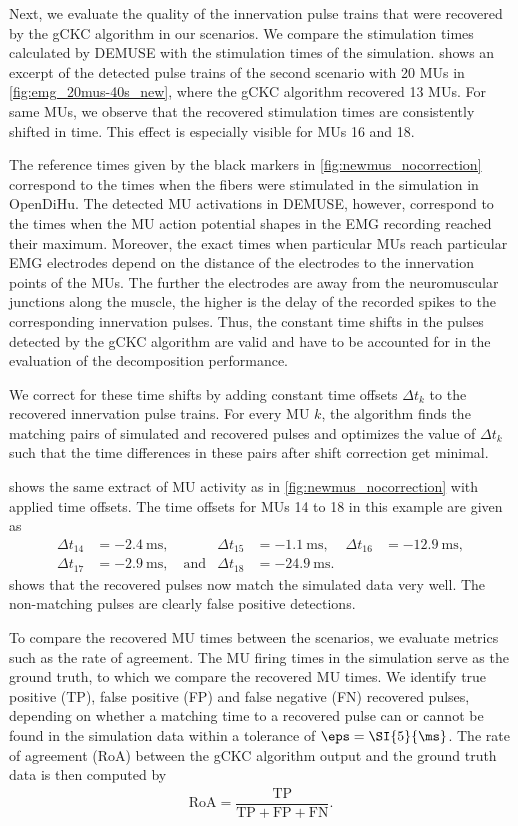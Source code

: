 Next, we evaluate the quality of the innervation pulse trains that were recovered by the gCKC algorithm in our scenarios. We compare the stimulation times calculated by DEMUSE with the stimulation times of the simulation.  shows an excerpt of the detected pulse trains of the second scenario with 20 MUs in \cref{fig:emg_20mus-40s_new}, where the gCKC algorithm recovered 13 MUs.  For same MUs, we observe that the recovered stimulation times are consistently shifted in time. This effect is especially visible for MUs 16 and 18. 

The reference times given by the black markers in \cref{fig:newmus_nocorrection} correspond to the times when the fibers were stimulated in the simulation in OpenDiHu. The detected MU activations in DEMUSE, however, correspond to the times when the MU action potential shapes in the EMG recording reached their maximum.
Moreover, the exact times when particular MUs reach particular EMG electrodes  depend on the distance of the electrodes to the innervation points of the MUs. The further the electrodes are away from the neuromuscular junctions along the muscle, the higher is the delay of the recorded spikes to the corresponding innervation pulses. Thus, the constant time shifts in the pulses detected by the gCKC algorithm are valid and have to be accounted for in the evaluation of the decomposition performance.

We correct for these time shifts by adding constant time offsets $\Delta t_k$ to the recovered innervation pulse trains. For every MU $k$, the algorithm finds the matching pairs of simulated and recovered pulses and optimizes the value of $\Delta t_k$ such that the time differences in these pairs after shift correction get minimal.

 shows the same extract of MU activity as in \cref{fig:newmus_nocorrection} with applied time offsets. The time offsets for MUs 14 to 18 in this example are given as
\begin{align*}
    \Delta t_{14}&=\SI{-2.4}{\ms}, & \Delta t_{15}&=\SI{-1.1}{\ms}, & \Delta t_{16}&=\SI{-12.9}{\ms},\\
    \Delta t_{17}&=\SI{-2.9}{\ms}, \quad \text{and} & \Delta t_{18}&=\SI{-24.9}{\ms}.
\end{align*}
 shows that the recovered pulses now match the simulated data very well. The non-matching pulses are clearly false positive detections.

To compare the recovered MU times between the scenarios, we evaluate metrics such as the rate of agreement. The MU firing times in the simulation serve as the ground truth, to which we compare the recovered MU times. We identify true positive (TP), false positive (FP) and false negative (FN) recovered pulses, depending on whether a matching time to a recovered pulse can or cannot be found in the simulation data within a tolerance of $\eps=\SI{5}{\ms}$. The rate of agreement (RoA) between the gCKC algorithm output and the ground truth data is then computed by%
\begin{align*}
  \textrm{RoA}  = \dfrac{\textrm{TP}}{\textrm{TP} + \textrm{FP} + \textrm{FN}}.
\end{align*}


